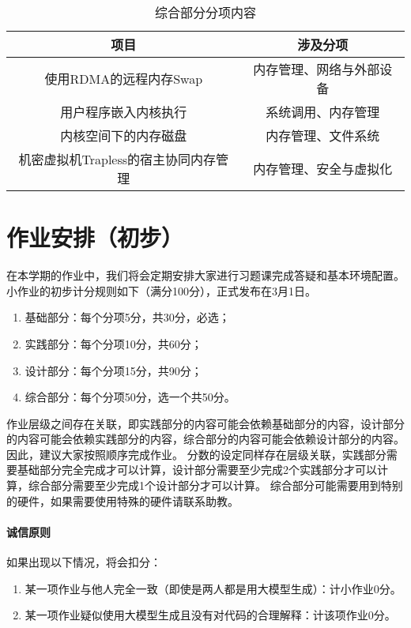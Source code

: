 \begin{table}[htbp]
\centering

\caption{综合部分分项内容}
\label{fig:intro:mixed}
\begin{tabular}{c|c}
\hline
项目              & 涉及分项         \\ \hline
使用RDMA的远程内存Swap & 内存管理、网络与外部设备 \\ \hline
用户程序嵌入内核执行 & 系统调用、内存管理 \\ \hline
内核空间下的内存磁盘 & 内存管理、文件系统 \\ \hline
机密虚拟机Trapless的宿主协同内存管理 & 内存管理、安全与虚拟化 \\ \hline

\end{tabular}

\end{table}

\section{作业安排（初步）}

在本学期的作业中，我们将会定期安排大家进行习题课完成答疑和基本环境配置。小作业的初步计分规则如下（满分100分），正式发布在3月1日。

\begin{enumerate}
    \item 基础部分：每个分项5分，共30分，必选；
    \item 实践部分：每个分项10分，共60分；
    \item 设计部分：每个分项15分，共90分；
    \item 综合部分：每个分项50分，选一个共50分。
\end{enumerate}

作业层级之间存在关联，即实践部分的内容可能会依赖基础部分的内容，设计部分的内容可能会依赖实践部分的内容，综合部分的内容可能会依赖设计部分的内容。因此，建议大家按照顺序完成作业。
分数的设定同样存在层级关联，实践部分需要基础部分完全完成才可以计算，设计部分需要至少完成2个实践部分才可以计算，综合部分需要至少完成1个设计部分才可以计算。
综合部分可能需要用到特别的硬件，如果需要使用特殊的硬件请联系助教。

\paragraph*{诚信原则}
如果出现以下情况，将会扣分：
\begin{enumerate}
    \item 某一项作业与他人完全一致（即使是两人都是用大模型生成）：计小作业0分。
    \item 某一项作业疑似使用大模型生成且没有对代码的合理解释：计该项作业0分。
\end{enumerate}

